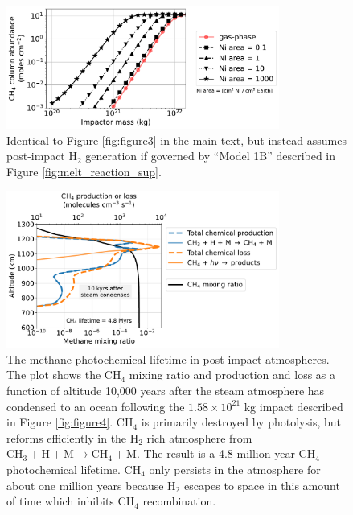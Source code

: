 \begin{figure}
  \centering
  \includegraphics[width=0.8\textwidth]{tex/5impacts/figures/supplement/Figure3_Citron.pdf}
  \caption{Identical to Figure \ref{fig:figure3} in the main text, but instead assumes post-impact H$_2$ generation if governed by ``Model 1B'' described in Figure \ref{fig:melt_reaction_sup}.}
  \label{fig:figure3_citron}
\end{figure}

\begin{figure}
  \centering
  \includegraphics[width=0.8\textwidth]{tex/5impacts/figures/supplement/CH4_prod_and_loss.pdf}
  \caption{The methane photochemical lifetime in post-impact atmospheres. The plot shows the CH$_4$ mixing ratio and production and loss as a function of altitude 10,000 years after the steam atmosphere has condensed to an ocean following the $1.58 \times 10^{21}$ kg impact described in Figure \ref{fig:figure4}. CH$_4$ is primarily destroyed by photolysis, but reforms efficiently in the H$_2$ rich atmosphere from $\mathrm{CH_3} + \mathrm{H} + \mathrm{M} \rightarrow \mathrm{CH_4} + \mathrm{M}$. The result is a 4.8 million year CH$_4$ photochemical lifetime. CH$_4$ only persists in the atmosphere for about one million years because H$_2$ escapes to space in this amount of time which inhibits CH$_4$ recombination.}
  \label{fig:ch4_prod_loss}
\end{figure}

